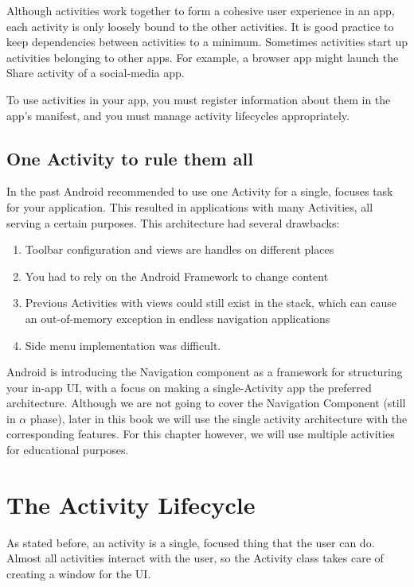 Although activities work together to form a cohesive user experience in an app, each activity is only loosely bound to the other activities.
It is good practice to keep dependencies between activities to a minimum.
Sometimes activities start up activities belonging to other apps.
For example, a browser app might launch the Share activity of a social-media app.

To use activities in your app, you must register information about them in the app’s manifest, and you must manage activity lifecycles appropriately.

\subsection{One Activity to rule them all}
\label{sec:oneactivity}
In the past Android recommended to use one Activity for a single, focuses task for your application.
This resulted in applications with many Activities, all serving a certain purposes.
This architecture had several drawbacks:

\begin{enumerate}
	\item Toolbar configuration and views are handles on different places
	\item You had to rely on the Android Framework to change content
	\item Previous Activities with views could still exist in the stack, which can cause an out-of-memory exception in endless navigation applications
	\item Side menu implementation was difficult.
\end{enumerate}

Android is introducing the Navigation component as a framework for structuring your in-app UI, with a focus on making a single-Activity app the preferred architecture.
Although we are not going to cover the Navigation Component (still in $\alpha$ phase), later in this book we will use the single activity architecture with the corresponding features.
For this chapter however, we will use multiple activities for educational purposes.

\section{The Activity Lifecycle}
As stated before, an activity is a single, focused thing that the user can do.
Almost all activities interact with the user, so the Activity class takes care of creating a window for the UI.

